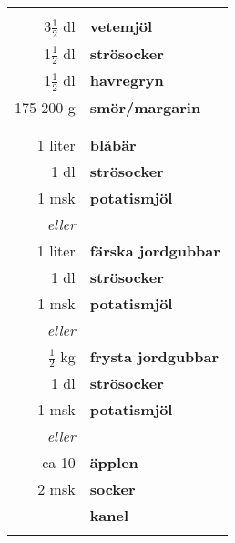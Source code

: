 \begin{table}[H]
	\begin{tabular}{rl}
	\hline
	&\\
		3$\frac{1}{2}$ dl & \textbf{vetemjöl}\\
		1$\frac{1}{2}$ dl & \textbf{strösocker}\\
		1$\frac{1}{2}$ dl & \textbf{havregryn}\\
		175-200 g & \textbf{smör/margarin}\\
		& \\
		\hline
		& \\
		1 liter & \textbf{blåbär}\\
		1 dl & \textbf{strösocker}\\
		1 msk & \textbf{potatismjöl}\\
		\textit{eller}& \\
		1 liter & \textbf{färska jordgubbar}\\
		1 dl & \textbf{strösocker}\\
		1 msk & \textbf{potatismjöl}\\
		\textit{eller}& \\
		$\frac{1}{2}$ kg & \textbf{frysta jordgubbar}\\
		1 dl & \textbf{strösocker}\\
		1 msk & \textbf{potatismjöl}\\
		\textit{eller}& \\
		ca 10 & \textbf{äpplen}\\
		2 msk & \textbf{socker}\\
		& \textbf{kanel} \\
	&\\
	\hline
	\end{tabular}
\end{table}


